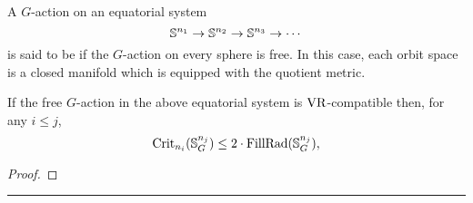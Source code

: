 A \(G\)-action on an equatorial system
\[
\mathbb{S}^{n_1} \to \mathbb{S}^{n_2} \to \mathbb{S}^{n_3} \to \dotsb
\]
is said to be  if the \(G\)-action on every sphere is free.
In this case, each orbit space is a closed manifold which is equipped with the quotient metric.


\medskip\lemma If the free \(G\)-action in the above equatorial system is \(\operatorname{VR}\)-compatible then, for any \(i \leq j\),
\[
\operatorname{Crit}_{n_i}(\mathbb{S}^{n_j}_G) \leq 2 \cdot \operatorname{FillRad}(\mathbb{S}^{n_j}_G),
\]

\begin{proof}
\end{proof}

\noindent\rule{\textwidth}{0.4pt}

